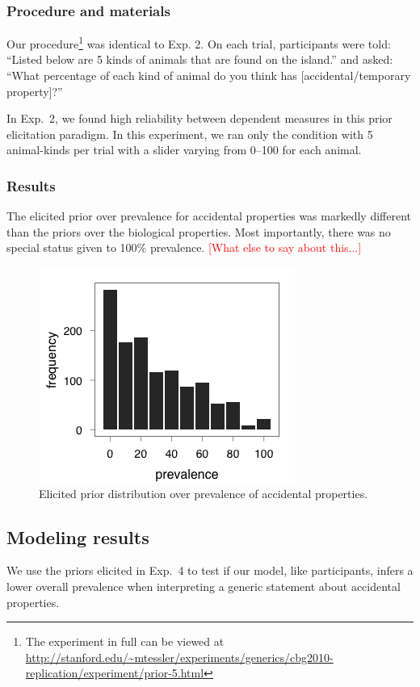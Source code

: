 \documentclass[10pt,letterpaper]{article}
\newcommand{\red}[1]{\textcolor{Red}{#1}}
\begin{document}
\subsubsection{Procedure and materials}

Our procedure\footnote{The experiment in full can be viewed at \url{http://stanford.edu/~mtessler/experiments/generics/cbg2010-replication/experiment/prior-5.html}} was identical to Exp. 2. On each trial, participants were told: ``Listed below are 5 kinds of animals that are found on the island.'' and asked: ``What percentage of each kind of animal do you think has [accidental/temporary property]?'' 

In Exp.~2, we found high reliability between dependent measures in this prior elicitation paradigm. In this experiment, we ran only the condition with 5 animal-kinds per trial with a slider varying from 0--100 for each animal.


\subsubsection{Results}

The elicited prior over prevalence for accidental properties was markedly different than the priors over the biological properties. Most importantly, there was no special status given to 100\% prevalence. \red{[What else to say about this...]}


\begin{figure}
\centering
    \includegraphics[width=0.5\columnwidth]{accidental_priors}
    \caption{Elicited prior distribution over prevalence of accidental properties.}
  \label{fig:accidentalpriors}
\end{figure}


\subsection{Modeling results}

We use the priors elicited in Exp.~4 to test if our model, like participants, infers a lower overall prevalence when interpreting a generic statement about accidental properties.
\end{document}
